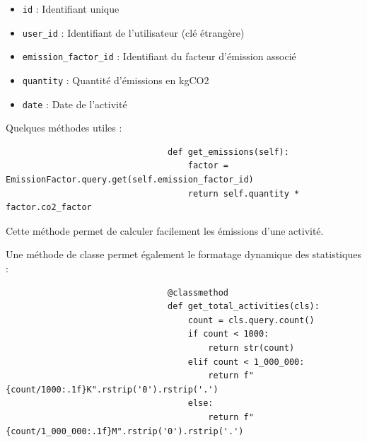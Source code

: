 \documentclass[a4paper,11pt]{article}
\begin{document}
\begin{enumerate}
                        \begin{itemize}
                            \item \texttt{id} : Identifiant unique
                            \item \texttt{user\_id} : Identifiant de l'utilisateur (clé étrangère)
                            \item \texttt{emission\_factor\_id} : Identifiant du facteur d'émission associé
                            \item \texttt{quantity} : Quantité d'émissions en kgCO2
                            \item \texttt{date} : Date de l'activité
                        \end{itemize}

                        \noindent Quelques méthodes utiles :

                        \begin{tcolorbox}[colback=lightgray!6, colframe=black, left=-45mm, right=5mm, top=2mm, bottom=0mm, boxrule=0.1mm]
                            \begin{verbatim}
                                def get_emissions(self):
                                    factor = EmissionFactor.query.get(self.emission_factor_id)
                                    return self.quantity * factor.co2_factor
                            \end{verbatim}
                        \end{tcolorbox}

                        \noindent Cette méthode permet de calculer facilement les émissions d'une activité.

                        \noindent Une méthode de classe permet également le formatage dynamique des statistiques :

                        \begin{tcolorbox}[colback=lightgray!6, colframe=black, left=-45mm, right=5mm, top=2mm, bottom=0mm, boxrule=0.1mm]
                            \begin{verbatim}
                                @classmethod
                                def get_total_activities(cls):
                                    count = cls.query.count()
                                    if count < 1000:
                                        return str(count)
                                    elif count < 1_000_000:
                                        return f"{count/1000:.1f}K".rstrip('0').rstrip('.')
                                    else:
                                        return f"{count/1_000_000:.1f}M".rstrip('0').rstrip('.')
                            \end{verbatim}
                        \end{tcolorbox}
                \end{enumerate}
\end{document}

